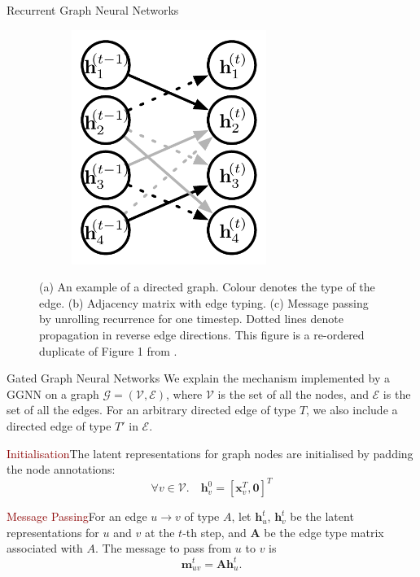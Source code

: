 \documentclass[final,hyperref={pdfpagelabels=false}]{beamer}
\newcommand{\shrink}{-15pt}
\begin{document}
\begin{frame}[t]
\begin{columns}[t]
\begin{column}{.3\textwidth}
\begin{block}{Recurrent Graph Neural Networks}
\begin{figure}
\begin{subfigure}{.25\textwidth}
          \includegraphics[height=3in]{imgs/unrolled-graph3.pdf}
          \caption{}
          \label{fig:sub2}
        \end{subfigure}
        
        \caption{(a) An example of a directed graph. Colour denotes the type of the edge. (b) Adjacency matrix with edge typing. (c) Message passing by unrolling recurrence for one timestep. Dotted lines denote propagation in reverse edge directions. This figure is a re-ordered duplicate of Figure 1 from \cite{DBLP:journals/corr/LiTBZ15}.}
        \label{fig:test}
      \end{figure}
      
      
    \end{block}
    
     \vspace{\shrink} 
    \begin{block}{Gated Graph Neural Networks}
    We explain the mechanism implemented by a GGNN on a graph $\mathcal{G}=(\mathcal{V}, \mathcal{E})$, where $\mathcal{V}$ is the set of all the nodes, and $\mathcal{E}$ is the set of all the edges. For an arbitrary directed edge of type $T$, we also include a directed edge of type $T'$ in $\mathcal{E}$.
    \vspace{0.2in}
    
    \textcolor{darkred}{Initialisation}\quad The latent representations for graph nodes are initialised by padding the node annotations:
    \begin{equation}
        \forall v \in \mathcal{V}. \quad \mathbf{h}_v^{0} = [\mathbf{x}_v^T, \mathbf{0}]^T
    \end{equation}
    
    
    \textcolor{darkred}{Message Passing}\quad For an edge $u \to v$ of type $A$, let $\mathbf{h}_u^t$, $\mathbf{h}_v^t$ be the latent representations for $u$ and $v$ at the $t$-th step, and $\mathbf{A}$ be the edge type matrix associated with $A$. The message to pass from $u$ to $v$ is
    \begin{equation}
        \mathbf{m}_{uv}^t = \mathbf{A} \mathbf{h}_u^t.
    \end{equation}
    

\end{block}
\end{column}
\end{columns}
\end{frame}
\end{document}
